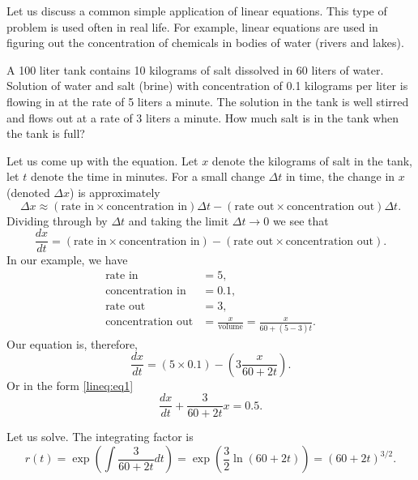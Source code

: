 \documentclass[12pt]{book}
\begin{document}
\begin{example}
Let us discuss a common
simple application of linear equations.
This type of 
problem is used often in real life.
For example, linear equations are used in
figuring out the concentration of
chemicals in bodies of water (rivers and lakes).

\begin{diffyfloatingfigurer}{1.45in}{1.75in}
\noindent
{}
\end{diffyfloatingfigurer}
A 100 liter tank contains 10 kilograms of salt dissolved in 60 liters of
water.  Solution of water and salt (brine) with concentration of 0.1
kilograms per
liter is flowing in at the rate of 5 liters a minute.  The solution
in the tank is well stirred and flows out at a rate of 3 liters a minute.
How much salt is in the tank when the tank is full?

Let us come up with the equation.  Let $x$ denote the kilograms of salt in the tank,
let $t$ denote the time in minutes.  For a small change $\Delta t$ in
time, the change in $x$ (denoted $\Delta x$) is approximately
\begin{equation*}
\Delta x \approx
(\text{rate in} \times \text{concentration in}) \Delta t - 
(\text{rate out} \times \text{concentration out}) \Delta t .
\end{equation*}
Dividing through by $\Delta t$ and
taking the limit $\Delta t \to 0$ we see that
\begin{equation*}
\frac{dx}{dt} =
(\text{rate in} \times \text{concentration in})  - 
(\text{rate out} \times \text{concentration out}) .
\end{equation*}
In our example, we have
\begin{align*}
\text{rate in} &= 5 , \\
\text{concentration in} &= 0.1 , \\
\text{rate out} &= 3 , \\
\text{concentration out} &= \frac{x}{\text{volume}} = \frac{x}{60+(5-3)t} .
\end{align*}
Our equation is, therefore,
\begin{equation*}
\frac{dx}{dt} =
(5 \times 0.1)  - 
\left(3 \frac{x}{60+2t}\right) .
\end{equation*}
Or in the form \eqref{lineq:eq1}
\begin{equation*}
\frac{dx}{dt} +
\frac{3}{60+2t} x
=
0.5 .
\end{equation*}

Let us solve.  The integrating factor is
\begin{equation*}
r(t) = \exp \left( \int \frac{3}{60+2t} dt  \right)
=
\exp \left( \frac{3}{2} \ln (60+2t) \right)
=
{(60+2t)}^{3/2} .
\end{equation*}


\end{example}
\end{document}
